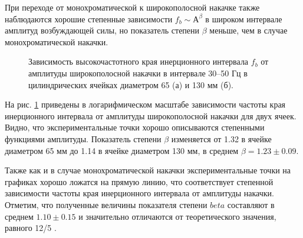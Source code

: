 При переходе от монохроматической к широкополосной накачке также наблюдаются хорошие степенные зависимости $f_b \sim А^\beta$ в широком интервале амплитуд возбуждающей силы, но показатель степени $\beta$ меньше, чем в случае монохроматической накачки.

\begin{figure}[ht]
  \begin{minipage}[ht]{0.49\linewidth}
  \end{minipage}
  \hfill
  \begin{minipage}[ht]{0.49\linewidth}
  \end{minipage}
  \caption{Зависимость высокочастотного края инерционного интервала $f_b$ от амплитуды широкополосной накачки в интервале 30–50 Гц в цилиндрических ячейках диаметром 65 (а) и 130 мм (б).}
  \label{img:water_fb_wide}  
\end{figure}

На рис. \ref{img:water_fb_wide} приведены в логарифмическом масштабе зависимости частоты края инерционного интервала от амплитуды широкополосной накачки для двух ячеек. Видно, что экспериментальные точки хорошо описываются степенными функциями амплитуды. Показатель степени $\beta$ изменяется от 1.32 в ячейке диаметром 65 мм до 1.14 в ячейке диаметром 130 мм, в среднем $\beta = 1.23 \pm 0.09$.

Также как и в случае монохроматической накачки экспериментальные точки на графиках хорошо ложатся на прямую линию, что соответствует степенной зависимости частоты края инерционного интервала от амплитуды накачки. Отметим, что полученные величины показателя степени $beta$ составляют в среднем $1.10 \pm 0.15$ и значительно отличаются от теоретического значения, равного 12/5 \cite{Ryzhenkova}.

